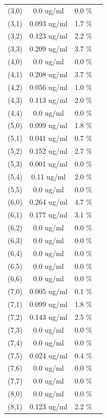 \documentclass{article}
\begin{document}
\begin{tabular}{c c c c}
(3,0)&        0.0 ug/ml        &0.0 \%\\
(3,1)&        0.093 ug/ml        &1.7 \%\\
(3,2)&        0.123 ug/ml        &2.2 \%\\
(3,3)&        0.209 ug/ml        &3.7 \%\\
(4,0)&        0.0 ug/ml        &0.0 \%\\
(4,1)&        0.208 ug/ml        &3.7 \%\\
(4,2)&        0.056 ug/ml        &1.0 \%\\
(4,3)&        0.113 ug/ml        &2.0 \%\\
(4,4)&        0.0 ug/ml        &0.0 \%\\
(5,0)&        0.099 ug/ml        &1.8 \%\\
(5,1)&        0.041 ug/ml        &0.7 \%\\
(5,2)&        0.152 ug/ml        &2.7 \%\\
(5,3)&        0.001 ug/ml        &0.0 \%\\
(5,4)&        0.11 ug/ml        &2.0 \%\\
(5,5)&        0.0 ug/ml        &0.0 \%\\
(6,0)&        0.264 ug/ml        &4.7 \%\\
(6,1)&        0.177 ug/ml        &3.1 \%\\
(6,2)&        0.0 ug/ml        &0.0 \%\\
(6,3)&        0.0 ug/ml        &0.0 \%\\
(6,4)&        0.0 ug/ml        &0.0 \%\\
(6,5)&        0.0 ug/ml        &0.0 \%\\
(6,6)&        0.0 ug/ml        &0.0 \%\\
(7,0)&        0.005 ug/ml        &0.1 \%\\
(7,1)&        0.099 ug/ml        &1.8 \%\\
(7,2)&        0.143 ug/ml        &2.5 \%\\
(7,3)&        0.0 ug/ml        &0.0 \%\\
(7,4)&        0.0 ug/ml        &0.0 \%\\
(7,5)&        0.024 ug/ml        &0.4 \%\\
(7,6)&        0.0 ug/ml        &0.0 \%\\
(7,7)&        0.0 ug/ml        &0.0 \%\\
(8,0)&        0.0 ug/ml        &0.0 \%\\
(8,1)&        0.123 ug/ml        &2.2 \%\\

\end{tabular}
\end{document}
